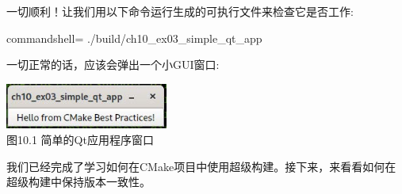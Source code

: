 一切顺利！让我们用以下命令运行生成的可执行文件来检查它是否工作:

\begin{tcblisting}{commandshell={}}
./build/ch10_ex03_simple_qt_app
\end{tcblisting}

一切正常的话，应该会弹出一个小GUI窗口:

\begin{center}
\includegraphics[width=0.4\textwidth]{content/2/chapter10/images/1.jpg}\\
图10.1 简单的Qt应用程序窗口
\end{center}

我们已经完成了学习如何在CMake项目中使用超级构建。接下来，来看看如何在超级构建中保持版本一致性。

















